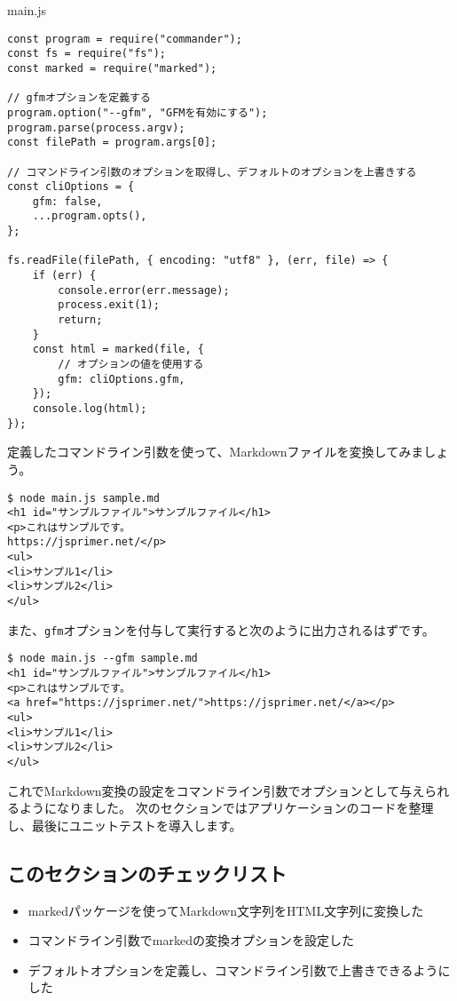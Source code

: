 \begin{listtitle}
main.js
\end{listtitle}
\begin{lstlisting}
const program = require("commander");
const fs = require("fs");
const marked = require("marked");

// gfmオプションを定義する
program.option("--gfm", "GFMを有効にする");
program.parse(process.argv);
const filePath = program.args[0];

// コマンドライン引数のオプションを取得し、デフォルトのオプションを上書きする
const cliOptions = {
    gfm: false,
    ...program.opts(),
};

fs.readFile(filePath, { encoding: "utf8" }, (err, file) => {
    if (err) {
        console.error(err.message);
        process.exit(1);
        return;
    }
    const html = marked(file, {
        // オプションの値を使用する
        gfm: cliOptions.gfm,
    });
    console.log(html);
});
\end{lstlisting}
\listend

定義したコマンドライン引数を使って、Markdownファイルを変換してみましょう。

\begin{lstlisting}
$ node main.js sample.md
<h1 id="サンプルファイル">サンプルファイル</h1>
<p>これはサンプルです。
https://jsprimer.net/</p>
<ul>
<li>サンプル1</li>
<li>サンプル2</li>
</ul>
\end{lstlisting}

また、\texttt{gfm}オプションを付与して実行すると次のように出力されるはずです。

\begin{lstlisting}
$ node main.js --gfm sample.md 
<h1 id="サンプルファイル">サンプルファイル</h1>
<p>これはサンプルです。
<a href="https://jsprimer.net/">https://jsprimer.net/</a></p>
<ul>
<li>サンプル1</li>
<li>サンプル2</li>
</ul>
\end{lstlisting}

これでMarkdown変換の設定をコマンドライン引数でオプションとして与えられるようになりました。
次のセクションではアプリケーションのコードを整理し、最後にユニットテストを導入します。

\hypertarget{section-checklist}{%
\subsection{このセクションのチェックリスト}\label{section-checklist}}

\begin{itemize}
\item
  markedパッケージを使ってMarkdown文字列をHTML文字列に変換した
\item
  コマンドライン引数でmarkedの変換オプションを設定した
\item
  デフォルトオプションを定義し、コマンドライン引数で上書きできるようにした
\end{itemize}

